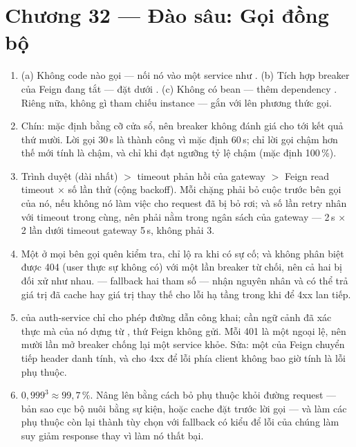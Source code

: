 \section*{Chương 32 --- Đào sâu: Gọi đồng bộ}
\begin{enumerate}
  \item (a) Không code nào gọi  --- nối nó vào
  một service như . (b) Tích hợp breaker của
  Feign đang tắt --- đặt  dưới
  . (c) Không
  có bean  --- thêm dependency
  \allowbreak{}.
  Riêng nữa, không gì tham chiếu instance  --- gắn
   với  lên phương
  thức gọi.
  \item Chín:  mặc định bằng cỡ cửa sổ,
  nên breaker không đánh giá cho tới kết quả thứ mười. Lời gọi 30\,s là
  thành công vì  mặc định 60\,s;
  chỉ lời gọi chậm hơn thế mới tính là chậm, và chỉ khi đạt ngưỡng tỷ
  lệ chậm (mặc định 100\,\%).
  \item Trình duyệt (dài nhất) $>$ timeout phản hồi của gateway $>$
  Feign read timeout $\times$ số lần thử (cộng backoff). Mỗi chặng phải
  bỏ cuộc trước bên gọi của nó, nếu không nó làm việc cho request đã bị
  bỏ rơi; và số lần retry nhân với timeout trong cùng, nên phải nằm
  trong ngân sách của gateway --- 2\,s $\times$ 2 lần dưới timeout
  gateway 5\,s, không phải 3.
  \item Một  ở mọi bên gọi quên kiểm tra,
  chỉ lộ ra khi có sự cố; và không phân biệt được 404 (user thực sự
  không có) với một lần breaker từ chối, nên cả hai bị đối xử như nhau.
   --- fallback hai tham số
  --- nhận nguyên nhân và có thể trả giá trị đã cache hay giá trị thay
  thế cho lỗi hạ tầng trong khi để 4xx lan tiếp.
  \item {} của auth-service chỉ cho phép đường dẫn
  công khai;  cần ngữ cảnh đã xác thực mà
   của nó dựng từ , thứ
  Feign không gửi. Mỗi 401 là một ngoại lệ, nên mười lần mở breaker
  chống lại một service khỏe. Sửa: một  của
  Feign chuyển tiếp header danh tính, và  cho
  4xx để lỗi phía client không bao giờ tính là lỗi phụ thuộc.
  \item $0{,}999^3 \approx 99{,}7\,\%$. Nâng lên bằng cách bỏ phụ
  thuộc khỏi đường request --- bản sao cục bộ nuôi bằng sự kiện, hoặc
  cache đặt trước lời gọi --- và làm các phụ thuộc còn lại thành tùy
  chọn với fallback có kiểu để lỗi của chúng làm suy giảm response thay
  vì làm nó thất bại.
\end{enumerate}

